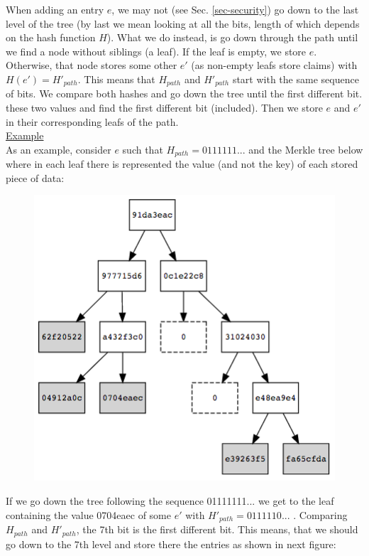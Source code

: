 \documentclass[11pt]{article}
\begin{document}
When adding an entry $e$, we may not (see Sec. \ref{sec-security}) go down to the last level of the tree (by last we mean looking at all the bits, length of which depends on the hash function $H$). What we do instead, is go down through the path until we find a node without siblings (a leaf). 
%
If the leaf is empty, we store $e$. Otherwise, that node stores some other $e'$ (as non-empty leafs store claims) with $H(e') = H'_{path}$. This means that $H_{path}$ and $H'_{path}$ start with the same sequence of bits. 
%
We compare both hashes and go down the tree until the first different bit. 
these two values and find the first different bit (included). 
Then we store $e$ and $e'$ in their corresponding leafs of the path.\\
%

{\underline{Example}}\\ 

As an example, consider $e$ such that $H_{path}=0111111...$ and the Merkle tree below where in each leaf there is represented the value (and not the key) of each stored piece of data:
%

\begin{figure}[h]
	\centering
	\includegraphics[scale=0.5]{images/ex-MT-5.png}
\end{figure}
If we go down the tree following the sequence 01111111... we get to the leaf containing the value 0704eaec of some $e'$ with $H'_{path}=0111110...$ . Comparing $H_{path}$ and $H'_{path}$, the 7th bit is the first different bit. This means, that we should go down to the 7th level and store there the entries as shown in next figure:
\end{document}
